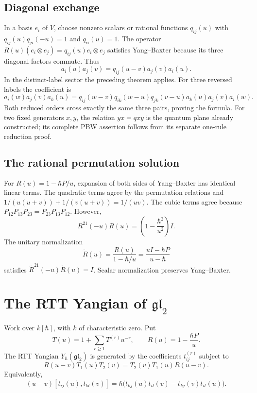 \subsection{Diagonal exchange}
In a basis $e_i$ of $V$, choose nonzero scalars or rational functions $q_{ij}(u)$ with
$q_{ij}(u)q_{ji}(-u)=1$ and $q_{ii}(u)=1$.
The operator $R(u)(e_i\otimes e_j)=q_{ij}(u)e_i\otimes e_j$ satisfies
Yang--Baxter because its three diagonal factors commute.
Thus
\[
 a_i(u)a_j(v)=q_{ij}(u-v)a_j(v)a_i(u).
\]
In the distinct-label sector the preceding theorem applies.
For three reversed labels the coefficient is
\[
 a_i(w)a_j(v)a_k(u)
 =q_{ij}(w-v)q_{ik}(w-u)q_{jk}(v-u)
   a_k(u)a_j(v)a_i(w).
\]
Both reduced orders cross exactly the same three pairs, proving the formula.
For two fixed generators $x,y$, the relation $yx=qxy$ is the quantum plane
already constructed; its complete PBW assertion follows from its separate
one-rule reduction proof.

\subsection{The rational permutation solution}
For $R(u)=1-\hbar P/u$, expansion of both sides of Yang--Baxter has identical
linear terms. The quadratic terms agree by the permutation relations and
$1/(u(u+v))+1/(v(u+v))=1/(uv)$.
The cubic terms agree because
$P_{12}P_{13}P_{23}=P_{23}P_{13}P_{12}$.
However,
\[
 R^{21}(-u)R(u)=\left(1-\frac{\hbar^2}{u^2}\right)I.
\]
The unitary normalization
\[
 \widetilde R(u)=\frac{R(u)}{1-\hbar/u}
 =\frac{uI-\hbar P}{u-\hbar}
\]
satisfies $\widetilde R^{21}(-u)\widetilde R(u)=I$.
Scalar normalization preserves Yang--Baxter.

\section{The RTT Yangian of \texorpdfstring{$\mathfrak{gl}_2$}{gl2}}
Work over $k[\hbar]$, with $k$ of characteristic zero. Put
\[
 T(u)=1+\sum_{r\ge1}T^{(r)}u^{-r},
 \qquad R(u)=1-\frac{\hbar P}{u}.
\]
The RTT Yangian $Y_\hbar(\mathfrak{gl}_2)$ is generated by the coefficients $t_{ij}^{(r)}$ subject to
\[
 R(u-v)T_1(u)T_2(v)=T_2(v)T_1(u)R(u-v).
\]
Equivalently,
\[
 (u-v)[t_{ij}(u),t_{kl}(v)]
 =\hbar\bigl(t_{kj}(u)t_{il}(v)-t_{kj}(v)t_{il}(u)\bigr).
\]

